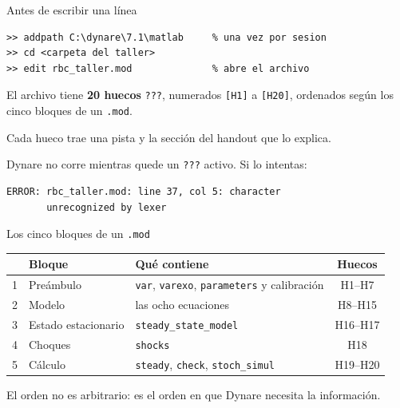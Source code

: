 \begin{frame}[fragile,label=arranque]{Antes de escribir una línea}
  \begin{lstlisting}[language={}]
>> addpath C:\dynare\7.1\matlab     % una vez por sesion
>> cd <carpeta del taller>
>> edit rbc_taller.mod              % abre el archivo
\end{lstlisting}
  \vspace{0.3cm}
  El archivo tiene \textbf{20 huecos} \texttt{???}, numerados \texttt{[H1]} a
  \texttt{[H20]}, ordenados según los cinco bloques de un \texttt{.mod}.\par
  \vspace{0.3cm}
  Cada hueco trae una pista y la sección del handout que lo explica.\par
  \vspace{0.3cm}
  Dynare no corre mientras quede un \texttt{???} activo. Si lo intentas:
  \begin{lstlisting}[language={}]
ERROR: rbc_taller.mod: line 37, col 5: character
       unrecognized by lexer
\end{lstlisting}
\end{frame}

\begin{frame}[label=bloques]{Los cinco bloques de un \texttt{.mod}}
  \centering
  \renewcommand{\arraystretch}{1.45}
  \begin{tabular}{@{}cl>{\raggedright\arraybackslash}p{4.4cm}c@{}}
    \toprule
    & \textbf{Bloque} & \textbf{Qué contiene} & \textbf{Huecos}\\
    \midrule
    1 & Preámbulo & \texttt{var}, \texttt{varexo}, \texttt{parameters} y calibración & H1--H7\\
    2 & Modelo & las ocho ecuaciones & H8--H15\\
    3 & Estado estacionario & \texttt{steady\_state\_model} & H16--H17\\
    4 & Choques & \texttt{shocks} & H18\\
    5 & Cálculo & \texttt{steady}, \texttt{check}, \texttt{stoch\_simul} & H19--H20\\
    \bottomrule
  \end{tabular}
  \par\vspace{0.4cm}\raggedright
  El orden no es arbitrario: es el orden en que Dynare necesita la información.
\end{frame}

